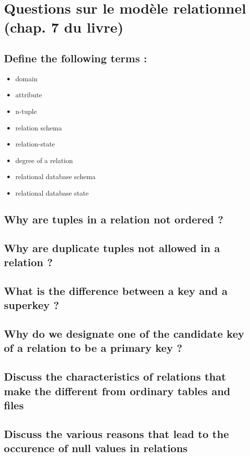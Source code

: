 \section{Questions sur le modèle relationnel (chap. 7 du livre)}

\subsection{Define the following terms :}
\begin{itemize}
	\item domain
	\item attribute
	\item n-tuple
	\item relation schema
	\item relation-state
	\item degree of a relation
	\item relational database schema
	\item relational database state
\end{itemize}


\subsection{Why are tuples in a relation not ordered ?}

\subsection{Why are duplicate tuples not allowed in a relation ?}

\subsection{What is the difference between a key and a superkey ?}

\subsection{Why do we designate one of the candidate key of a relation to be a primary key ?}

\subsection{Discuss the characteristics of relations that make the different from ordinary tables and files}

\subsection{Discuss the various reasons that lead to the occurence of null values in relations}

